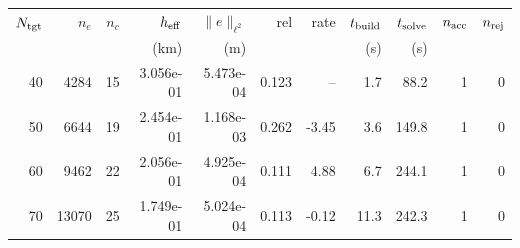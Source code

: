 \begin{tabular}{rrrrrrrrrrr}
\hline
$N_{\rm tgt}$ & $n_e$ & $n_c$ & $h_{\rm eff}$ & $\|e\|_{\ell^2}$ & rel & rate & $t_{\rm build}$ & $t_{\rm solve}$ & $n_{\rm acc}$ & $n_{\rm rej}$ \\
 & & & (km) & (m) & & & (s) & (s) & & \\
\hline
40 & 4284 & 15 & 3.056e-01 & 5.473e-04 & 0.123 & -- & 1.7 & 88.2 & 1 & 0 \\
50 & 6644 & 19 & 2.454e-01 & 1.168e-03 & 0.262 & -3.45 & 3.6 & 149.8 & 1 & 0 \\
60 & 9462 & 22 & 2.056e-01 & 4.925e-04 & 0.111 & 4.88 & 6.7 & 244.1 & 1 & 0 \\
70 & 13070 & 25 & 1.749e-01 & 5.024e-04 & 0.113 & -0.12 & 11.3 & 242.3 & 1 & 0 \\
\hline
\end{tabular}
